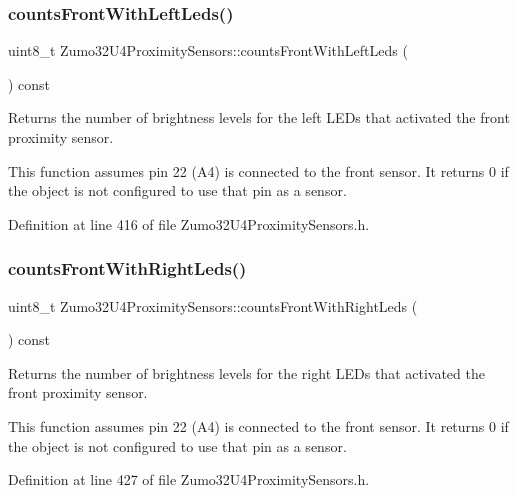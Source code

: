 \subsubsection{\texorpdfstring{counts\+Front\+With\+Left\+Leds()}{countsFrontWithLeftLeds()}}
{\footnotesize\ttfamily uint8\+\_\+t Zumo32\+U4\+Proximity\+Sensors\+::counts\+Front\+With\+Left\+Leds (\begin{DoxyParamCaption}{ }\end{DoxyParamCaption}) const\hspace{0.3cm}{\ttfamily [inline]}}



Returns the number of brightness levels for the left L\+E\+Ds that activated the front proximity sensor. 

This function assumes pin 22 (A4) is connected to the front sensor. It returns 0 if the object is not configured to use that pin as a sensor. 

Definition at line 416 of file Zumo32\+U4\+Proximity\+Sensors.\+h.

\mbox{\label{class_zumo32_u4_proximity_sensors_a6eb08641584b371308b6901a0423e564}} 
\subsubsection{\texorpdfstring{counts\+Front\+With\+Right\+Leds()}{countsFrontWithRightLeds()}}
{\footnotesize\ttfamily uint8\+\_\+t Zumo32\+U4\+Proximity\+Sensors\+::counts\+Front\+With\+Right\+Leds (\begin{DoxyParamCaption}{ }\end{DoxyParamCaption}) const\hspace{0.3cm}{\ttfamily [inline]}}



Returns the number of brightness levels for the right L\+E\+Ds that activated the front proximity sensor. 

This function assumes pin 22 (A4) is connected to the front sensor. It returns 0 if the object is not configured to use that pin as a sensor. 

Definition at line 427 of file Zumo32\+U4\+Proximity\+Sensors.\+h.

